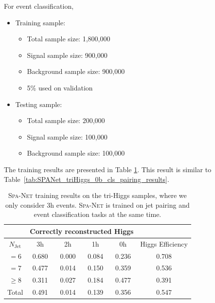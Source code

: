 \documentclass[12pt]{article}
\begin{document}
        For event classification,
        \begin{itemize}
            \item Training sample:
            \begin{itemize}
                \item Total sample size: 1,800,000
                \item Signal sample size: 900,000
                \item Background sample size: 900,000
                \item 5\% used on validation
            \end{itemize}
            \item Testing sample:
            \begin{itemize}
                \item Total sample size: 200,000
                \item Signal sample size: 100,000
                \item Background sample size: 100,000
            \end{itemize}
        \end{itemize}

        The training results are presented in Table \ref{tab:SPANet_triHiggs_0b_3h_cls_pairing_results}. This result is similar to Table~\ref{tab:SPANet_triHiggs_0b_cls_pairing_results}.

        \begin{table}[htpb]
            \centering
            \caption{\textsc{Spa-Net} training results on the tri-Higgs samples, where we only consider 3h events. \textsc{Spa-Net} is trained on jet pairing and event classification tasks at the same time.}
            \label{tab:SPANet_triHiggs_0b_3h_cls_pairing_results}
            \begin{tabular}{c|cccc|c}
            \multicolumn{1}{l|}{} & \multicolumn{4}{c|}{Correctly reconstructed Higgs} & \multicolumn{1}{l}{} \\ \hline
            $N_\text{Jet}$        & 3h          & 2h         & 1h         & 0h         & Higgs Efficiency     \\ \hline
            $=6$                  & 0.680       & 0.000      & 0.084      & 0.236      & 0.708                \\
            $=7$                  & 0.477       & 0.014      & 0.150      & 0.359      & 0.536                \\
            $\ge 8$               & 0.311       & 0.027      & 0.184      & 0.477      & 0.391                \\ \hline
            Total                 & 0.491       & 0.014      & 0.139      & 0.356      & 0.547
            \end{tabular}

        \end{table}
\end{document}
